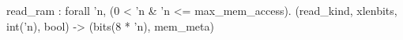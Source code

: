 read_ram : forall 'n, (0 < 'n & 'n <= max_mem_access). (read_kind, xlenbits, int('n), bool) -> (bits(8 * 'n), mem_meta)